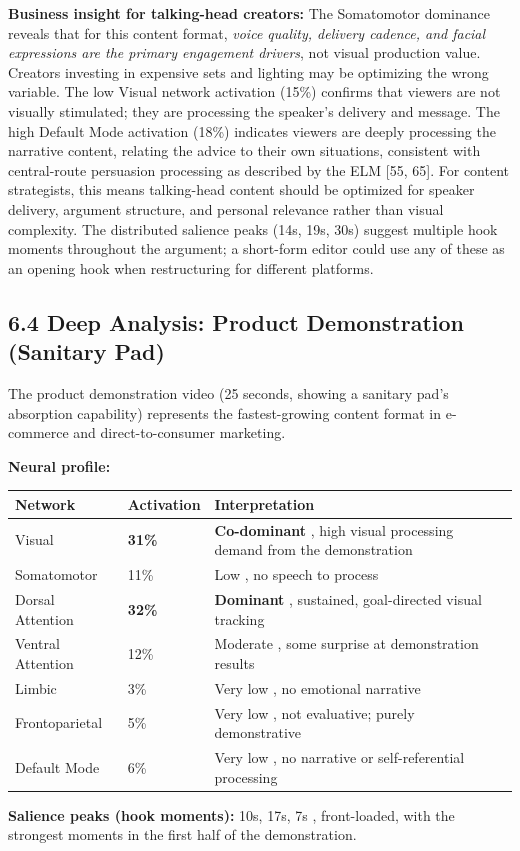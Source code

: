 \documentclass[11pt,letterpaper]{article}
\begin{document}
\textbf{Business insight for talking-head creators:} The Somatomotor dominance reveals that for this content format, \textit{voice quality, delivery cadence, and facial expressions are the primary engagement drivers}, not visual production value. Creators investing in expensive sets and lighting may be optimizing the wrong variable. The low Visual network activation (15\%) confirms that viewers are not visually stimulated; they are processing the speaker's delivery and message. The high Default Mode activation (18\%) indicates viewers are deeply processing the narrative content, relating the advice to their own situations, consistent with central-route persuasion processing as described by the ELM [55, 65]. For content strategists, this means talking-head content should be optimized for speaker delivery, argument structure, and personal relevance rather than visual complexity. The distributed salience peaks (14s, 19s, 30s) suggest multiple hook moments throughout the argument; a short-form editor could use any of these as an opening hook when restructuring for different platforms.

\subsection{6.4 Deep Analysis: Product Demonstration (Sanitary Pad)}

The product demonstration video (25 seconds, showing a sanitary pad's absorption capability) represents the fastest-growing content format in e-commerce and direct-to-consumer marketing.

\textbf{Neural profile:}

\begin{table}[htbp]
\centering
\small
\begin{tabular}{|p{}|p{}|p{}|}
\hline
Network & Activation & Interpretation \\
\hline
Visual & \textbf{31\%} & \textbf{Co-dominant} , high visual processing demand from the demonstration \\
Somatomotor & 11\% & Low , no speech to process \\
Dorsal Attention & \textbf{32\%} & \textbf{Dominant} , sustained, goal-directed visual tracking \\
Ventral Attention & 12\% & Moderate , some surprise at demonstration results \\
Limbic & 3\% & Very low , no emotional narrative \\
Frontoparietal & 5\% & Very low , not evaluative; purely demonstrative \\
Default Mode & 6\% & Very low , no narrative or self-referential processing \\
\hline
\end{tabular}
\end{table}
\textbf{Salience peaks (hook moments):} 10s, 17s, 7s , front-loaded, with the strongest moments in the first half of the demonstration.
\end{document}

